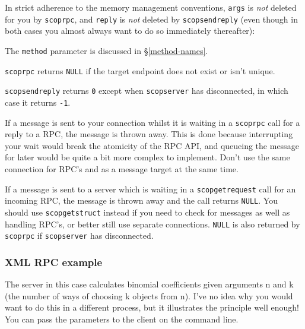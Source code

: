 \documentclass[12pt,a4paper,twoside]{article}
\renewcommand{\_}{\texttt{\symbol{95}}}
\begin{document}
In strict adherence to the memory management conventions,
\texttt{args} is \textit{not} deleted for you by \texttt{scop\_rpc},
and \texttt{reply} is \textit{not} deleted by
\texttt{scop\_send\_reply} (even though in both cases you almost always
want to do so immediately thereafter):

The \texttt{method} parameter is discussed in \S\ref{method-names}.

\texttt{scop\_rpc} returns \texttt{NULL} if the target endpoint
does not exist or isn't unique.

\texttt{scop\_send\_reply} returns \texttt{0} except when
\texttt{scopserver} has disconnected, in which case it returns
\texttt{-1}.

If a message is sent to your connection whilst it is waiting in
a \texttt{scop\_rpc} call for a reply to a RPC, the message
is thrown away. This is done because interrupting your wait
would break the atomicity of the RPC API, and queueing the
message for later would be quite a bit more complex to implement.
Don't use the same connection for RPC's and as a message target
at the same time.

If a message is sent to a server which is waiting in a
\texttt{scop\_get\_request} call for an incoming RPC, the message is
thrown away and the call returns \texttt{NULL}. You should use
\texttt{scop\_get\_struct} instead if you need to
check for messages as well as handling RPC's, or better still
use separate connections. \texttt{NULL} is also returned by
\texttt{scop\_rpc} if \texttt{scopserver} has disconnected.

\subsubsection*{XML RPC example}

The server in this case calculates binomial coefficients
given arguments n and k (the number of ways of choosing k
objects from n). I've no idea why you would want to do this
in a different process, but it illustrates the principle
well enough! You can pass the parameters to the client
on the command line.
\end{document}
